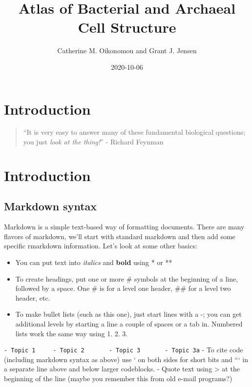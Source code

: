 \documentclass[]{tufte-book}
\title{Atlas of Bacterial and Archaeal Cell Structure}
\author{Catherine M. Oikonomou and Grant J. Jensen}
\date{2020-10-06}
\providecommand{\tightlist}{%
  \setlength{\itemsep}{0pt}\setlength{\parskip}{0pt}}
\begin{document}
\maketitle



{
\setcounter{tocdepth}{1}
\tableofcontents
}

\chapter*{Introduction}\label{introduction}

\begin{quote}
``It is very easy to answer many of these fundamental biological
questions; you just \emph{look at the thing!}'' - Richard Feynman
\citep{feynman1960}
\end{quote}

\chapter{Introduction}\label{intro}

\section{Markdown syntax}\label{markdown-syntax}

Markdown is a simple text-based way of formatting documents. There are
many flavors of markdown, we'll start with standard markdown and then
add some specific rmarkdown information. Let's look at some other
basics:

\begin{itemize}
\tightlist
\item
  You can put text into \emph{italics} and \textbf{bold} using * or **
\item
  To create headings, put one or more \# symbols at the beginning of a
  line, followed by a space. One \# is for a level one header, \#\# for
  a level two header, etc.
\item
  To make bullet lists (such as this one), just start lines with a -;
  you can get additional levels by starting a line a couple of spaces or
  a tab in. Numbered lists work the same way using 1. 2. 3.
\end{itemize}

\texttt{-\ Topic\ 1\ \ \ \ \ -\ Topic\ 2\ \ \ \ \ \ \ -\ Topic\ 3\ \ \ \ \ \ \ -\ Topic\ 3a}
- To cite code (including markdown syntax as above) use ` on both sides
for short bits and ``` in a separate line above and below larger
codeblocks. - Quote text using \textgreater{} at the beginning of the
line (maybe you remember this from old e-mail programs?)
\end{document}
